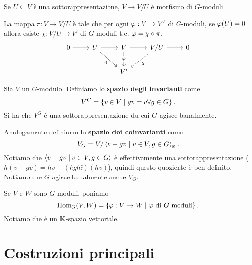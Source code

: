 \begin{example}
    Se $U\subseteq V$ \`e una sottorappresentazione, $V\to V/U$ \`e morfismo di $G$-moduli
\end{example}

\begin{remark}
La mappa $\pi:V\to V/U$ \`e tale che per ogni $\varphi:V\to V'$ di $G$-moduli, se $\varphi(U)=0$ allora esiste $\chi:V/U\to V'$ di $G$-moduli t.c. $\varphi=\chi\circ \pi$.
\[\begin{tikzcd}
	0 & U & V & {V/U} & 0 \\
	&& {V'}
	\arrow[from=1-1, to=1-2]
	\arrow[from=1-2, to=1-3]
	\arrow["0"', from=1-2, to=2-3]
	\arrow[from=1-3, to=1-4]
	\arrow["\vp"{description}, from=1-3, to=2-3]
	\arrow[from=1-4, to=1-5]
	\arrow["\chi", dashed, from=1-4, to=2-3]
\end{tikzcd}\]
\end{remark}


\begin{definition}
Sia $V$ un $G$-modulo. Definiamo lo \textbf{spazio degli invarianti} come
\[V^G=\left\{{v\in V\mid gv=v\forall g\in G}\right\}.\] Si ha che $V^G$ \`e una sottorappresentazione du cui $G$ agisce banalmente.

Analogamente definiamo lo \textbf{spazio dei coinvarianti} come
\[V_G=V/\left\langle {v-gv\mid v\in V,g\in G}\right\rangle_{\mathbb{K}}.\]
Notiamo che $\left\langle {v-gv\mid v\in V,g\in G}\right\rangle$ \`e effettivamente una sottorappresentazione ($h(v-gv)=hv-(hgh\ii)(hv)$), quindi questo quoziente \`e ben definito. Notiamo che $G$ agisce banalmente anche $V_G$.
\end{definition}


\begin{notation}
Se $V$ e $W$ sono $G$-moduli, poniamo
\[\operatorname{Hom}_G(V,W)=\left\{{\varphi:V\to W\mid \text{$\varphi$ di $G$-moduli}}\right\}.\]
Notiamo che \`e un $\mathbb{K}$-spazio vettoriale.
\end{notation}

\section{Costruzioni principali}

